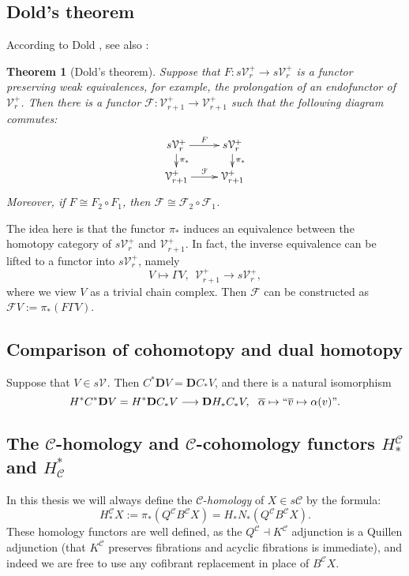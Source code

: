 \documentclass[11pt]{amsart}
\theoremstyle{plain}
\newtheorem{thm}{Theorem}[section]
\theoremstyle{definition}
\renewcommand{\to}{\longrightarrow}
\newcommand{\calF}{\mathcal{F}}
\newcommand{\calV}{\mathcal{V}}
\newcommand{\calc}{\mathcal{C}}
\theoremstyle{plain}
\newcommand{\vect}[2]{\calV^{#1}_{#2}}
\newcommand{\F}{\mathbb{F}}
\newcommand{\Ftwo}{\F_2}
\newcommand{\dual}{\mathbf{D}}
\begin{document}
\begin{Conventions and notation}
\subsection{Dold's theorem}
According to Dold \cite{DoldHomologySPs.pdf}, see also \cite[Lemma 3.1]{ChingUnpublished}: 
\begin{thm}[Dold's theorem]\label{Dold's theorem}
Suppose that $F:s\vect{+}{r}\to s\vect{+}{r}$ is a functor preserving weak equivalences, for example, the prolongation of an endofunctor of $\vect{+}{r}$. Then there is a functor $\calF:\vect{+}{r+1}\to\vect{+}{r+1}$ such that the following diagram commutes:
\[\xymatrix@R=4mm{
s\vect{+}{r}\ar[r]^-{F}
\ar[d]^-{\pi_*}
&%
s\vect{+}{r}\ar[d]^-{\pi_*}
\\%
\vect{+}{r+1}\ar[r]^-{\calF}
&
\vect{+}{r+1}
}\]
Moreover, if $F\cong F_2\circ F_1$, then $\calF\cong \calF_2\circ \calF_1$.
\end{thm}
\noindent The idea here is that the functor $\pi_*$ induces an equivalence between the homotopy category of $s\vect{+}{r}$ and $\vect{+}{r+1}$. In fact, the inverse equivalence can be lifted to a functor into $s\vect{+}{r}$, namely 
\[V\mapsto \Gamma V,\ \ \vect{+}{r+1}\to s\vect{+}{r},\]
where we view $V$ as a trivial chain complex. Then $\calF$ can be constructed as $\calF V:=\pi_*(F\Gamma V)$.

\subsection{Comparison of cohomotopy and dual homotopy}
Suppose that $V\in s\vect{}{}$. Then $C^*\dual V=\dual C_*V$, and there is a natural isomorphism
\[H^*C^*\dual V=H^*\dual C_*V\to\dual H_* C_*V,\ \ \overline{\alpha}\mapsto\textup{``$\overline{v}\mapsto\alpha(v)$''}.\]

\subsection{The $\calc$-homology and $\calc$-cohomology functors $H^{\calc}_*$ and $H_{\calc}^*$}



In this thesis we will always define the $\calc$-\emph{homology} of $X\in s\calc$ by the formula:
\[H_*^{\calc}X:=\pi_*(Q^\calc B^\calc X)=H_*N_*(Q^\calc B^\calc X).\]
These homology functors are well defined, as the $Q^\calc\dashv K^\calc$ adjunction is a Quillen adjunction (that $K^\calc$ preserves fibrations and acyclic fibrations is immediate), and indeed we are free to use any cofibrant replacement in place of $B^\calc X$.


\end{Conventions and notation}
\end{document}
